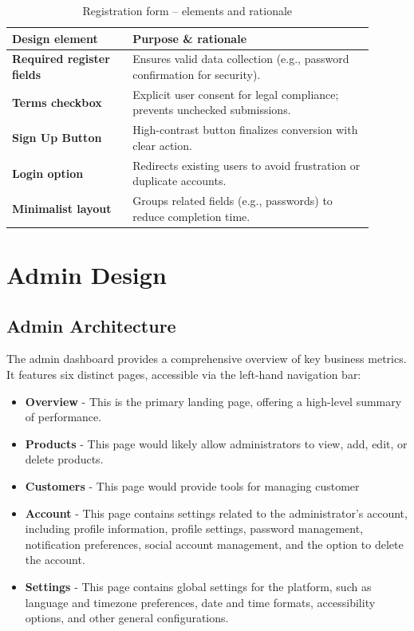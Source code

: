 \documentclass[12pt]{article}
\begin{document}
	\begin{table}[H]
		\centering
		\caption{Registration form – elements and rationale}
		\label{tab:register-elements}
		\begin{tabular}{p{0.30\linewidth} p{0.60\linewidth}}
			\hline
			\textbf{Design element} & \textbf{Purpose \& rationale} \\ 	\hline
			\textbf{Required register fields}   & Ensures valid data collection (e.g., password confirmation for security). \\
			\textbf{Terms checkbox}          	& Explicit user consent for legal compliance; prevents unchecked submissions. \\
			\textbf{Sign Up Button}      	    & High-contrast button finalizes conversion with clear action. \\
			\textbf{Login option}            	& Redirects existing users to avoid frustration or duplicate accounts. \\
			\textbf{Minimalist layout}       	& Groups related fields (e.g., passwords) to reduce completion time. \\
			\hline
		\end{tabular}
	\end{table}

	
	\section{Admin Design}\label{sec:admin-design}
	\vspace{0.3cm}
	
	
	\subsection{Admin Architecture}\label{subsec:admin-architecture}
	The admin dashboard provides a comprehensive overview of key business metrics.
	It features six distinct pages, accessible via the left-hand navigation bar:
	\begin{itemize}
		\item \textbf{Overview} - This is the primary landing page, offering a high-level summary of performance.
		\item \textbf{Products} - This page would likely allow administrators to view, add, edit, or delete products.
		\item \textbf{Customers} - This page would provide tools for managing customer
		\item \textbf{Account} - This page contains settings related to the administrator's account, including profile information, profile settings, password management, notification preferences, social account management, and the option to delete the account.
		\item \textbf{Settings} - This page contains global settings for the platform, such as language and timezone preferences, date and time formats, accessibility options, and other general configurations.
	\end{itemize}
	\newpage
\end{document}
